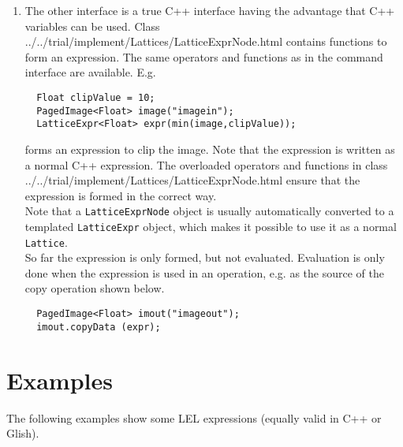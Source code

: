 \begin{itemize}
\begin{enumerate}
  \item
    The other interface is a true C++ interface having the
    advantage that C++ variables can be used. Class
    {../../trial/implement/Lattices/LatticeExprNode.html}
    contains functions to form an expression. The same operators
    and functions as in the command interface are available.
    E.g.
\begin{verbatim}
  Float clipValue = 10;
  PagedImage<Float> image("imagein");
  LatticeExpr<Float> expr(min(image,clipValue));
\end{verbatim}
    forms an expression to clip the image. Note that the expression is
    written as a normal C++ expression. The overloaded operators and
    functions in class 
    {../../trial/implement/Lattices/LatticeExprNode.html}
    ensure that the expression is formed in the correct way.
    \\ Note that a \texttt{LatticeExprNode} object is usually
    automatically converted to a templated \texttt{LatticeExpr} object,
    which makes it possible to use it as a normal \texttt{Lattice}.
    \\So far the expression is only formed, but not evaluated.
    Evaluation is only done when the expression is used in an
    operation, e.g. as the source of the copy operation shown below.
\begin{verbatim}
  PagedImage<Float> imout("imageout");
  imout.copyData (expr);
\end{verbatim}

  \end{enumerate}

\end{itemize}

\section{\label{LEL:EXAMPLES}{Examples}}
The following examples show some LEL expressions (equally valid 
in C++ or Glish).

